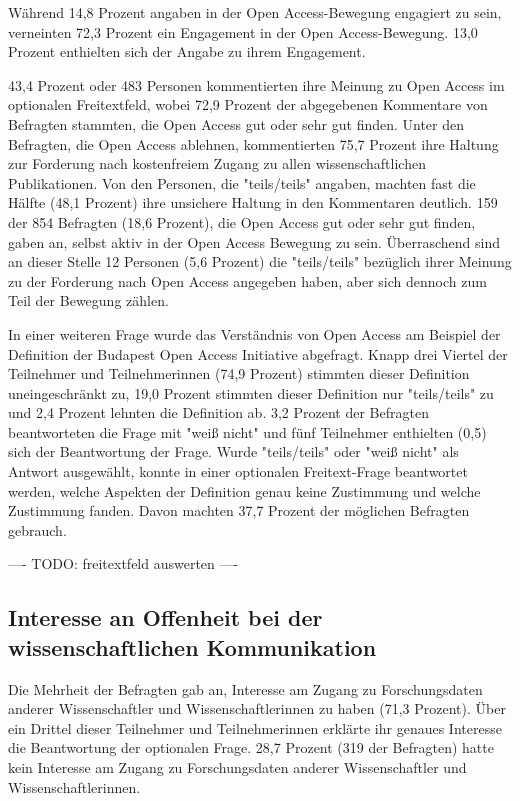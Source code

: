 Während 14,8 Prozent angaben in der Open Access-Bewegung engagiert zu sein, verneinten 72,3 Prozent ein Engagement in der Open Access-Bewegung. 13,0 Prozent enthielten sich der Angabe zu ihrem Engagement.

43,4 Prozent oder 483 Personen kommentierten ihre Meinung zu Open Access im optionalen Freitextfeld, wobei 72,9 Prozent der abgegebenen Kommentare von Befragten stammten, die Open Access gut oder sehr gut finden. Unter den Befragten, die Open Access ablehnen, kommentierten 75,7 Prozent ihre Haltung zur Forderung nach kostenfreiem Zugang zu allen wissenschaftlichen Publikationen. Von den Personen, die "teils/teils" angaben, machten fast die Hälfte (48,1 Prozent) ihre unsichere Haltung in den Kommentaren deutlich. 159 der 854 Befragten (18,6 Prozent), die Open Access gut oder sehr gut finden, gaben an, selbst aktiv in der Open Access Bewegung zu sein. Überraschend sind an dieser Stelle 12 Personen (5,6 Prozent) die "teils/teils" bezüglich ihrer Meinung zu der Forderung nach Open Access angegeben haben, aber sich dennoch zum Teil der Bewegung zählen.

In einer weiteren Frage wurde das Verständnis von Open Access am Beispiel der Definition der Budapest Open Access Initiative \cite{boai_2012} abgefragt. Knapp drei Viertel der Teilnehmer und Teilnehmerinnen (74,9 Prozent) stimmten dieser Definition uneingeschränkt zu, 19,0 Prozent stimmten dieser Definition nur "teils/teils" zu und 2,4 Prozent lehnten die Definition ab. 3,2 Prozent der Befragten beantworteten die Frage mit "weiß nicht" und fünf Teilnehmer enthielten (0,5) sich der Beantwortung der Frage. Wurde "teils/teils" oder "weiß nicht" als Antwort ausgewählt, konnte in einer optionalen Freitext-Frage beantwortet werden, welche Aspekten der Definition genau keine Zustimmung und welche Zustimmung fanden. Davon machten 37,7 Prozent der möglichen Befragten gebrauch.

---- TODO: freitextfeld auswerten ----

\subsection{Interesse an Offenheit bei der wissenschaftlichen Kommunikation}

Die Mehrheit der Befragten gab an, Interesse am Zugang zu Forschungsdaten anderer Wissenschaftler und Wissenschaftlerinnen zu haben (71,3 Prozent). Über ein Drittel dieser Teilnehmer und Teilnehmerinnen erklärte ihr genaues Interesse die Beantwortung der optionalen Frage. 28,7 Prozent (319 der Befragten) hatte kein Interesse am Zugang zu Forschungsdaten anderer Wissenschaftler und Wissenschaftlerinnen.

